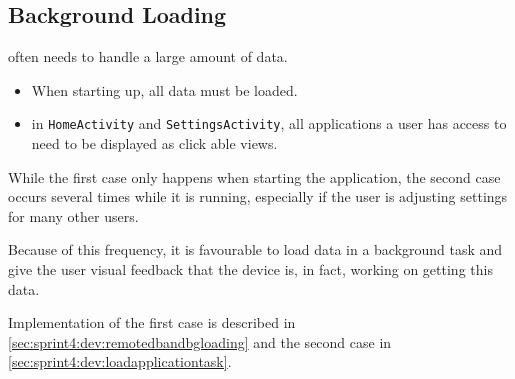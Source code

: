 \subsection{Background Loading}

\launcher often needs to handle a large amount of data.

\begin{itemize}
\item When starting up, all data must be loaded.
\item in \lstinline!HomeActivity! and \lstinline!SettingsActivity!, all applications a user has access to need to be displayed as click able views.
\end{itemize}

While the first case only happens when starting the application, the second case occurs several times while it is running, especially if the user is adjusting settings for many other users.

Because of this frequency, it is favourable to load data in a background task and give the user visual feedback that the device is,  in fact, working on getting this data.

Implementation of the first case is described in \cref{sec:sprint4:dev:remotedbandbgloading} and the second case in \cref{sec:sprint4:dev:loadapplicationtask}.